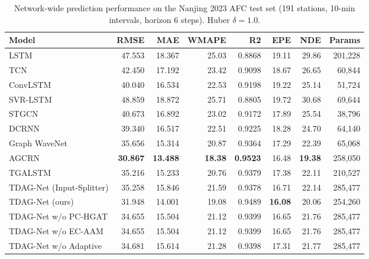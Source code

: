 \begin{table}[!t]
\caption{Network-wide prediction performance on the Nanjing 2023 AFC test set (191 stations, 10-min intervals, horizon 6 steps). Huber $\delta=1.0$.}
\label{tab:main_results}
\centering
\footnotesize
\begin{tabular}{lrrrrrrr}
\toprule
Model & RMSE & MAE & WMAPE & R2 & EPE & NDE & Params \\
\midrule
LSTM & 47.553 & 18.367 & 25.03 & 0.8868 & 19.11 & 29.86 & 201,228 \\
TCN & 42.450 & 17.192 & 23.42 & 0.9098 & 18.67 & 26.65 & 60,844 \\
ConvLSTM & 40.040 & 16.534 & 22.53 & 0.9198 & 19.22 & 25.14 & 51,724 \\
SVR-LSTM & 48.859 & 18.872 & 25.71 & 0.8805 & 19.72 & 30.68 & 69,644 \\
STGCN & 40.673 & 16.892 & 23.02 & 0.9172 & 17.89 & 25.54 & 38,796 \\
DCRNN & 39.340 & 16.517 & 22.51 & 0.9225 & 18.28 & 24.70 & 64,140 \\
Graph WaveNet & 35.656 & 15.314 & 20.87 & 0.9364 & 17.29 & 22.39 & 65,068 \\
AGCRN & \textbf{30.867} & \textbf{13.488} & \textbf{18.38} & \textbf{0.9523} & 16.48 & \textbf{19.38} & 258,050 \\
TGALSTM & 35.216 & 15.233 & 20.76 & 0.9379 & 17.38 & 22.11 & 210,527 \\
TDAG-Net (Input-Splitter) & 35.258 & 15.846 & 21.59 & 0.9378 & 16.71 & 22.14 & 285,477 \\
TDAG-Net (ours) & 31.948 & 14.001 & 19.08 & 0.9489 & \textbf{16.08} & 20.06 & 254,260 \\
TDAG-Net w/o PC-HGAT & 34.655 & 15.504 & 21.12 & 0.9399 & 16.65 & 21.76 & 285,477 \\
TDAG-Net w/o EC-AAM & 34.655 & 15.504 & 21.12 & 0.9399 & 16.65 & 21.76 & 285,477 \\
TDAG-Net w/o Adaptive & 34.681 & 15.614 & 21.28 & 0.9398 & 17.31 & 21.77 & 285,477 \\
\bottomrule
\end{tabular}
\end{table}

